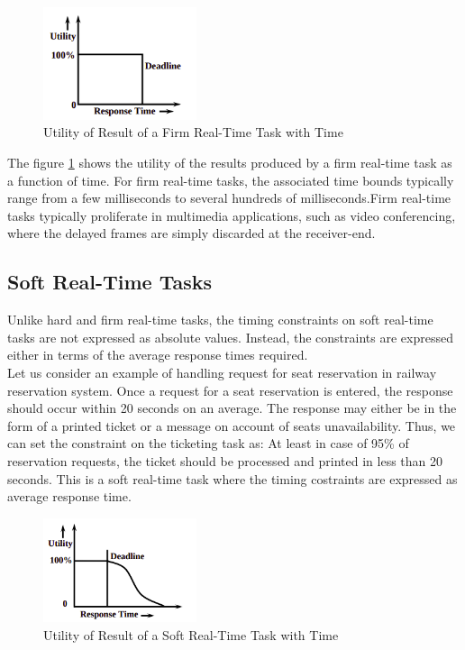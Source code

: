\documentclass[12pt]{report}
\begin{document}
\begin{figure}[h]
\centering
\includegraphics[width=0.4\textwidth]{images/firm-rts.png}
\caption{Utility of Result of a Firm Real-Time Task with Time}
\label{fig:firm-rts}
\end{figure}

The figure \ref{fig:firm-rts} shows the utility of the results produced by a firm real-time task as a function of time. For firm real-time tasks, the associated time bounds typically range from a few milliseconds to several hundreds of milliseconds.Firm real-time tasks typically proliferate in multimedia applications, such as video conferencing, where the delayed frames are simply discarded at the receiver-end. 

\subsection{Soft Real-Time Tasks}
Unlike hard and firm real-time tasks, the timing constraints on soft real-time tasks are not expressed as absolute values. Instead, the constraints are expressed either in terms of the average response times required.\\

Let us consider an example of handling request for seat reservation in railway reservation system. Once a request for a seat reservation is entered, the response should occur within 20 seconds on an average. The response may either be in the form of a printed ticket or a message on account of seats unavailability. Thus, we can set the constraint on the ticketing task as: At least in case of 95\% of reservation requests, the ticket should be processed and printed in less than 20 seconds. This is a soft real-time task where the timing costraints are expressed as average response time. 
\begin{figure}[h]
\centering
\includegraphics[width=0.4\textwidth]{images/soft-rts.png}
\caption{Utility of Result of a Soft Real-Time Task with Time}
\label{fig:soft-rts}
\end{figure}
\end{document}
